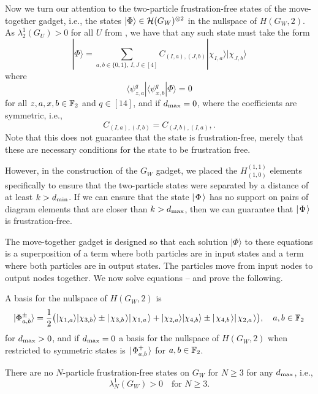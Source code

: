 \documentclass[../thesis-main/thesis-main]{subfiles}
\begin{document}
Now we turn our attention to the two-particle frustration-free states of the move-together gadget, i.e., the states $|\Phi\rangle\in\mathcal{H}(G_{W})^{\otimes 2}$ in the nullspace of $H(G_W,2)$. As $\lambda_2^1(G_{U}) >0$ for all $U$ from , we have that any such state must take the form
\begin{equation}
|\Phi\rangle=\sum_{a,b \in \{0,1\},\,I,J \in [4]}C_{(I,a),(J,b)}|\chi_{I,a}\rangle|\chi_{J,b}\rangle\label{eq:chi_superposition}
\end{equation}
where 
\begin{equation}
\langle\psi_{z,a}^{q}|\langle\psi_{x,b}^{q}|\Phi\rangle=0\label{eq:frustration_free}
\end{equation}
for all $z,a,x,b\in\mathbb{F}_2$ and $q\in[14]$, and if $d_{\text{max}} = 0$, where the coefficients are symmetric, i.e.,
\begin{equation}
C_{(I,a),(J,b)}=C_{(J,b),(I,a)},\label{eq:symmetric_coefs}.
\end{equation}  
Note that this does not guarantee that the state is frustration-free, merely that these are necessary conditions for the state to be frustration free.  

However, in the construction of the $G_W$ gadget, we placed the $H_{(1,0)}^{(1,1)}$ elements specifically to ensure that the two-particle states were separated by a distance of at least $k > d_{\text{min}}$.  If we can ensure that the state $|\mspace{2mu} \Phi \mspace{2mu} \rangle$ has no support on pairs of diagram elements that are closer than $k > d_{\text{max}}$, then we can guarantee that $|\mspace{2mu} \Phi \mspace{2mu} \rangle$ is frustration-free.

The move-together gadget is designed so that each solution $|\Phi\rangle$ to these equations  is a superposition of a term where both particles are in input states and a term where both particles are in output states. The particles move from input nodes to output nodes together. We now solve equations -- and prove the following.

\begin{lemma}
\label{lem:Wgadget_lemma}
A basis for the nullspace of $H(G_{W},2)$ is 
\begin{equation}
  |\Phi_{a,b}^{\pm}\rangle= \frac{1}{2} \big( |\chi_{1,a}\rangle|\chi_{3,b}\rangle \pm |\mspace{2mu} \chi_{3,b} \mspace{2mu} \rangle{|\mspace{2mu}\chi_{1,a} \mspace{2mu}\rangle} 
  + |\chi_{2,a}\rangle|\chi_{4,b}\rangle \pm |\mspace{2mu} \chi_{4,b} \mspace{2mu} \rangle|\mspace{2mu} \chi_{2,a} \mspace{2mu} \rangle\big),\quad a,b\in \mathbb{F}_2\label{eq:phi_a1_a2}
\end{equation}
for $d_{\text{max}} > 0$, and if $d_{\text{max}} = 0$ a basis for the nullspace of $H(G_{W},2)$ when restricted to symmetric states is $|\mspace{2mu} \Phi_{a,b}^+ \mspace{2mu} \rangle$ for $a,b\in \mathbb{F}_2$.  

There are no $N$-particle frustration-free states on $G_{W}$ for $N\geq3$ for any $d_{\text{max}}$, i.e.,
\begin{equation}
\lambda_{N}^{1}(G_{W})>0\quad\text{for }N\geq3.
\end{equation}
\end{lemma}
\end{document}
